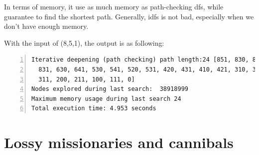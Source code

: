 \documentclass{article}
\begin{document}
In terms of memory, it use as much memory as path-checking dfs, while guarantee to find the shortest path. Generally, idfs is not bad, especially when we don't have enough memory.

With the input of (8,5,1), the output is as following:

\begin{lstlisting}[numbers=left]
Iterative deepening (path checking) path length:24 [851, 830, 841, 820,
  831, 630, 641, 530, 541, 520, 531, 420, 431, 410, 421, 310, 321, 300,
  311, 200, 211, 100, 111, 0]
Nodes explored during last search:  38918999
Maximum memory usage during last search 24
Total execution time: 4.953 seconds
\end{lstlisting}






\section{Lossy missionaries and cannibals}
\end{document}
